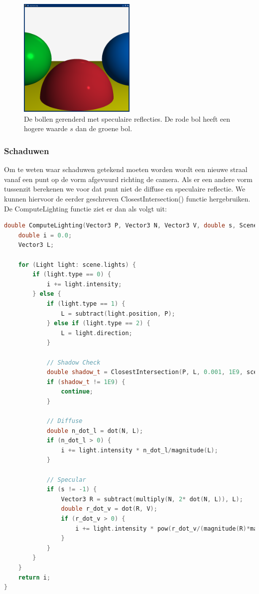 \documentclass[12pt, a4paper]{article}
\begin{document}
\begin{figure}[h]
    \centering
    \includegraphics[width=0.50\textwidth]{renders/specular.png}
    \caption{De bollen gerenderd met speculaire reflecties. De rode bol heeft een hogere waarde $s$ dan de groene bol.}
    \label{fig:specular}
\end{figure}

\subsubsection{Schaduwen}
Om te weten waar schaduwen getekend moeten worden wordt een nieuwe straal vanaf een punt op de vorm afgevuurd richting de camera. Als er een andere vorm tussenzit berekenen we voor dat punt niet de diffuse en speculaire reflectie. We kunnen hiervoor de eerder geschreven ClosestIntersection() functie hergebruiken. De ComputeLighting functie ziet er dan als volgt uit:

\begin{lstlisting}[language=C++]
double ComputeLighting(Vector3 P, Vector3 N, Vector3 V, double s, Scene scene) {
    double i = 0.0;
    Vector3 L;

    for (Light light: scene.lights) {
        if (light.type == 0) {
            i += light.intensity;
        } else {
            if (light.type == 1) {
                L = subtract(light.position, P);
            } else if (light.type == 2) {
                L = light.direction;
            }

            // Shadow Check
            double shadow_t = ClosestIntersection(P, L, 0.001, 1E9, scene).second;
            if (shadow_t != 1E9) {
                continue;
            } 

            // Diffuse
            double n_dot_l = dot(N, L);
            if (n_dot_l > 0) {
                i += light.intensity * n_dot_l/magnitude(L);
            }

            // Specular
            if (s != -1) {
                Vector3 R = subtract(multiply(N, 2* dot(N, L)), L);
                double r_dot_v = dot(R, V);
                if (r_dot_v > 0) {
                    i += light.intensity * pow(r_dot_v/(magnitude(R)*magnitude(V)), s);
                }
            }
        }
    }
    return i;
}
\end{lstlisting}
\end{document}
